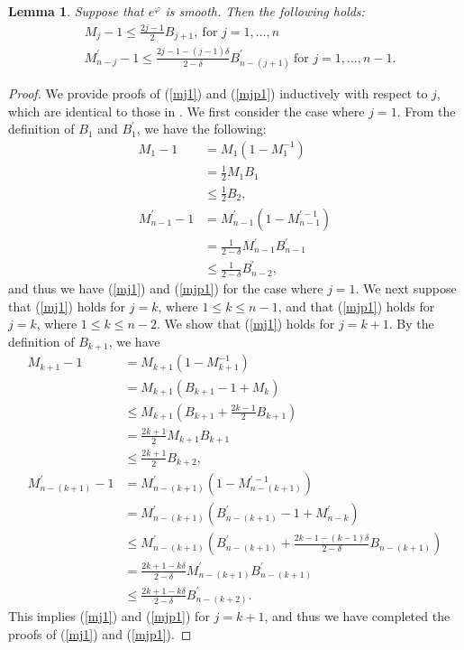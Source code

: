 \documentclass[12pt]{article}
\theoremstyle{definition}
\newtheorem{lemm}[defi]{Lemma}
\begin{document}
\begin{lemm}
{\it Suppose that $e^\varphi$ is smooth. Then the following holds:
\begin{align}
&M_j-1\leq \frac{2j-1}{2} B_{j+1},\ \text{for $j=1,\dots, n$}\label{mj1}\\
&M_{n-j}^\prime-1\leq \frac{2j-1-(j-1)\delta}{2-\delta}B_{n-(j+1)}^\prime\ \text{for $j=1,\dots, n-1$}.\label{mjp1}
\end{align}
}
\end{lemm}
\begin{proof}
We provide proofs of (\ref{mj1}) and (\ref{mjp1}) inductively with respect to $j$, which are identical to those in \cite[Proof of Claim 4.2 (3)]{LM1}. We first consider the case where $j=1$. From the definition of $B_1$ and $B_1^\prime$, we have the following:
\begin{align*}
M_1-1&=M_1(1-M_1^{-1}) \\
&=\frac{1}{2}M_1B_1 \\
&\leq \frac{1}{2}B_2, \\
M_{n-1}^\prime-1&=M_{n-1}^\prime(1-M_{n-1}^{\prime-1}) \\
&=\frac{1}{2-\delta}M_{n-1}^\prime B_{n-1}^\prime \\
&\leq \frac{1}{2-\delta} B_{n-2}^\prime,
\end{align*}
and thus we have (\ref{mj1}) and (\ref{mjp1}) for the case where $j=1$.
We next suppose that (\ref{mj1}) holds for $j=k$, where $1\leq k\leq n-1$, and that (\ref{mjp1}) holds for $j=k$, where $1\leq k\leq n-2$. We show that (\ref{mj1}) holds for $j=k+1$. By the definition of $B_{k+1}$, we have 
\begin{align*}
M_{k+1}-1&=M_{k+1}(1-M_{k+1}^{-1}) \\
&=M_{k+1}(B_{k+1}-1+M_k) \\
&\leq M_{k+1}(B_{k+1}+\frac{2k-1}{2}B_{k+1}) \\
&=\frac{2k+1}{2}M_{k+1}B_{k+1} \\
&\leq \frac{2k+1}{2}B_{k+2}, \\
M_{n-(k+1)}^\prime -1&=M_{n-(k+1)}^\prime(1-M_{n-(k+1)}^{\prime-1}) \\
&=M_{n-(k+1)}^\prime(B_{n-(k+1)}^\prime-1+M_{n-k}^\prime) \\
&\leq M_{n-(k+1)}^\prime(B_{n-(k+1)}^\prime+\frac{2k-1-(k-1)\delta}{2-\delta}B_{n-(k+1)}) \\
&=\frac{2k+1-k\delta}{2-\delta}M_{n-(k+1)}^\prime B_{n-(k+1)}^\prime \\
&\leq \frac{2k+1-k\delta}{2-\delta}B_{n-(k+2)}^\prime.
\end{align*}
This implies (\ref{mj1}) and (\ref{mjp1}) for $j=k+1$, and thus we have completed the proofs of (\ref{mj1}) and (\ref{mjp1}). 
\end{proof}
\end{document}
